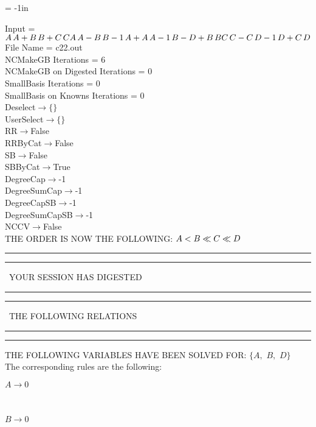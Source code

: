 \voffset = -1in
\evensidemargin 0.1in
\oddsidemargin 0.1in
\textheight 9in
\textwidth 6in

\normalsize
\baselineskip=12pt
\noindent
Input = 
$
\\A\,
 A + B\,
 B + C\,
 C\\
A\,
 A - B\,
 B\\
-1\,
 A + A\,
 A\\
-1\,
 B - D + B\,
 B\\
C\,
 C - C\,
 D\\
-1\,
 D + C\,
 D\\
$
File Name = c22.out\\
NCMakeGB Iterations = 6\\
NCMakeGB on Digested Iterations = 0\\
SmallBasis Iterations = 0\\
SmallBasis on Knowns Iterations = 0\\
Deselect$\rightarrow \{\}$\\
UserSelect$\rightarrow \{\}$\\
RR$\rightarrow $False\\
RRByCat$\rightarrow $False\\
SB$\rightarrow $False\\
SBByCat$\rightarrow $True\\
DegreeCap$\rightarrow $-1\\
DegreeSumCap$\rightarrow $-1\\
DegreeCapSB$\rightarrow $-1\\
DegreeSumCapSB$\rightarrow $-1\\
NCCV$\rightarrow $False\\
THE ORDER IS NOW THE FOLLOWING:\hfil\break
$
A<B\ll
C\ll
D\\
$
\rule[2pt]{6in}{4pt}\hfil\break
\rule[2pt]{1.879in}{4pt}
\ YOUR SESSION HAS DIGESTED\ 
\rule[2pt]{1.879in}{4pt}\hfil\break
\rule[2pt]{1.923in}{4pt}
\ THE FOLLOWING RELATIONS\ 
\rule[2pt]{1.923in}{4pt}\hfil\break
\rule[2pt]{6in}{4pt}\hfil\break
THE FOLLOWING VARIABLES HAVE BEEN SOLVED FOR:\hfil\break
$\{A,
$ $
B,
$ $
D\}$
\smallskip\\
The corresponding rules are the following:\smallskip\\
\begin{minipage}{6in}
$
A\rightarrow 0
$
\end{minipage}\medskip\\
\begin{minipage}{6in}
$
B\rightarrow 0
$
\end{minipage}\medskip\\
